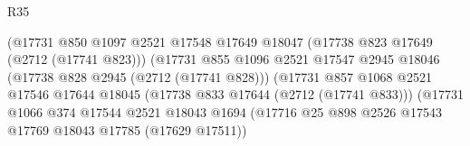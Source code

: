 \begin{lexlean}{R35}
\begin{coremodule}
                                                  (@17731
                                                    @850
                                                    @1097
                                                    @2521
                                                    @17548
                                                    @17649
                                                    @18047
                                                    (@17738 @823 @17649 (@2712 (@17741 @823)))
                                                    (@17731
                                                      @855
                                                      @1096
                                                      @2521
                                                      @17547
                                                      @2945
                                                      @18046
                                                      (@17738 @828 @2945 (@2712 (@17741 @828)))
                                                      (@17731
                                                        @857
                                                        @1068
                                                        @2521
                                                        @17546
                                                        @17644
                                                        @18045
                                                        (@17738 @833 @17644 (@2712 (@17741 @833)))
                                                        (@17731
                                                          @1066
                                                          @374
                                                          @17544
                                                          @2521
                                                          @18043
                                                          @1694
                                                          (@17716
                                                            @25
                                                            @898
                                                            @2526
                                                            @17543
                                                            @17769
                                                            @18043
                                                            @17785
                                                            (@17629 @17511))

\end{coremodule}
\end{lexlean}
